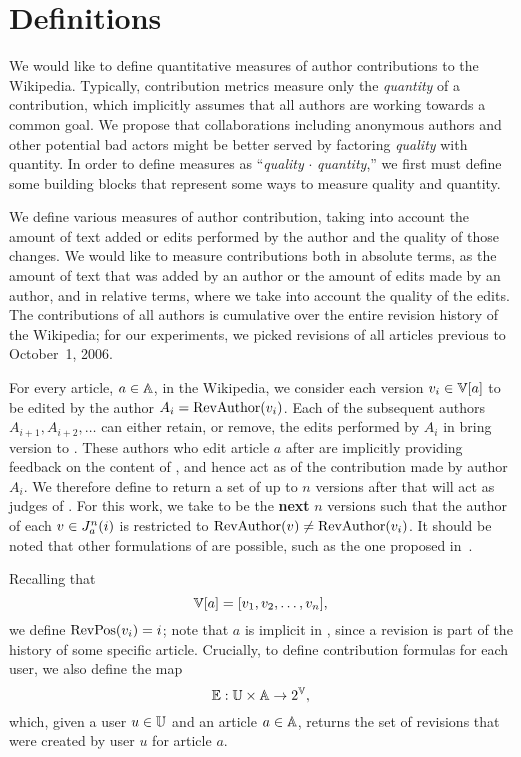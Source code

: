 \section{Definitions}

We would like to define quantitative measures of author 
contributions to the Wikipedia.
Typically, contribution metrics measure only the
\textit{quantity} of a contribution,
which implicitly assumes that all authors
are working towards a common goal.
We propose that collaborations including anonymous
authors and other potential bad actors might be better served by factoring
\textit{quality} with quantity.
In order to define measures as
``\textit{quality} $\cdot$ \textit{quantity},''
we first must define some building blocks that represent
some ways to measure quality and quantity.

We define various measures of author contribution, taking into
account the amount of text added or edits performed by the author
and the quality of those changes.
We would like to measure contributions both in absolute terms,
as the amount of text that was added by an author or the
amount of edits made by an author, and in relative terms, 
where we take into account the quality of the edits.
The contributions of all authors is cumulative over the 
entire revision history of the Wikipedia;
for our experiments, we picked revisions of all articles
previous to October~1, 2006.

For every article, $a \in \mathbb{A}$, in the Wikipedia,
we consider each version $\version{i} \in \versions{a}$
to be edited by the author $A_i = \mathrm{RevAuthor}(v_{i})$.
Each of the subsequent authors $A_{i+1}, A_{i+2}, \ldots$ can either
retain, or remove, the edits performed by $A_i$ in bring
version  to .
These authors who edit article $a$ after 
are implicitly providing feedback on the content of , and hence
act as  of the contribution made by author $A_i$.
We therefore define  to return a set of up to $n$ versions
after  that will act as judges of .
For this work, we take  to be the \textbf{next} $n$
versions such that the author of each $v_{} \in J_{a}^{n}(i)$
is restricted to $\mathrm{RevAuthor}(v_{}) \ne \mathrm{RevAuthor}(v_{i})$.
It should be noted that other formulations of 
are possible, such as the one proposed in~\cite{Chatterjee2008}.

Recalling that
\begin{equation*}
    \versions{a} = [ \version{1}, \version{2}, \ldots, \version{n} ],
\end{equation*}
we define $\mathrm{RevPos}(v_{i}) = i$;
note that $a$ is implicit in , since a revision
is part of the history of some specific article.
Crucially, to define contribution formulas for each user,
we also define the map
\begin{equation*}
\authorrevs{} : \users \times \articles \to 2^\versions{},
\end{equation*}
which, given a user $u \in \mathbb{U}$ and an article $a \in \mathbb{A}$, returns
the set of revisions that were created by user $u$ for article $a$.

